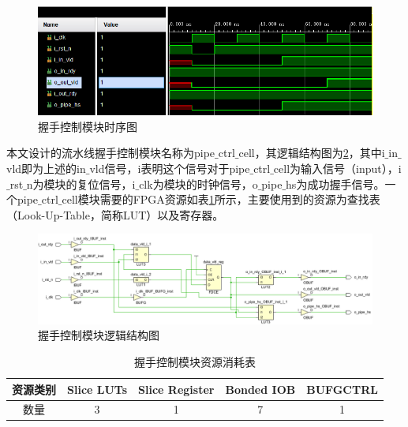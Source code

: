 \begin{figure}[htb]
    \centering
    \includegraphics[width=14cm]{fig/5-fig/握手控制模块时序图.jpg}
    \caption{握手控制模块时序图}
    \label{fig:握手控制模块时序图}
\end{figure}

本文设计的流水线握手控制模块名称为pipe$\_$ctrl$\_$cell，其逻辑结构图为\ref{fig:握手控制模块逻辑结构图}，其中i$\_$in$\_$vld即为上述的in$\_$vld信号，i表明这个信号对于pipe$\_$ctrl$\_$cell为输入信号（input），i$\_$rst$\_$n为模块的复位信号，i$\_$clk为模块的时钟信号，o$\_$pipe$\_$hs为成功握手信号。一个pipe$\_$ctrl$\_$cell模块需要的FPGA资源如表\ref{tab:握手控制模块资源消耗表}所示，主要使用到的资源为查找表（Look-Up-Table，简称LUT）以及寄存器。
\begin{figure}[htb]
    \centering
    \includegraphics[width=14cm]{fig/5-fig/握手控制模块逻辑结构图.jpg}
    \caption{握手控制模块逻辑结构图}
    \label{fig:握手控制模块逻辑结构图}
  \end{figure}

  \begin{table}[H]
    \centering
    \caption{握手控制模块资源消耗表}
    \label{tab:握手控制模块资源消耗表}
    \begin{tabular}{c|c|c|c|c}
        \hline
        资源类别 & Slice LUTs & Slice Register & Bonded IOB & BUFGCTRL \\ \hline
        数量     & 3          & 1              & 7          & 1        \\ \hline
    \end{tabular}
  \end{table}

